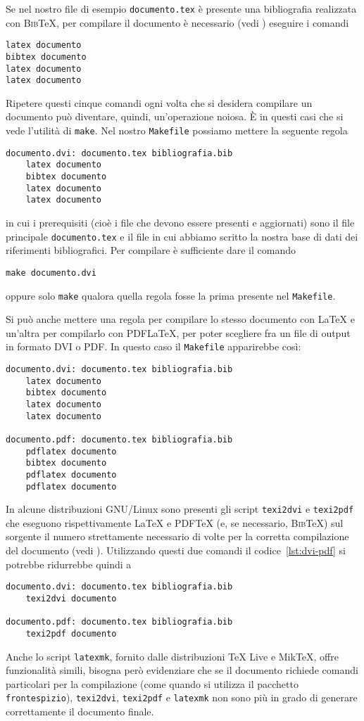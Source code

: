 Se nel nostro file di esempio \verb|documento.tex| è presente una bibliografia
realizzata con \textsc{Bib}\TeX, per compilare il documento è necessario (vedi
\textcite[120]{pantieri:latex}) eseguire i comandi
\begin{verbatim}
latex documento
bibtex documento
latex documento
latex documento
\end{verbatim}

Ripetere questi cinque comandi ogni volta che si desidera compilare un documento
può diventare, quindi, un'operazione noiosa.  È in questi casi che si vede
l'utilità di \verb|make|.  Nel nostro \verb|Makefile| possiamo mettere la
seguente regola
\begin{lstlisting}
documento.dvi: documento.tex bibliografia.bib
	latex documento
	bibtex documento
	latex documento
	latex documento
\end{lstlisting}
in cui i prerequisiti (cioè i file che devono essere presenti e aggiornati) sono
il file principale \verb|documento.tex| e il file in cui abbiamo scritto la
nostra base di dati dei riferimenti bibliografici.  Per compilare è sufficiente
dare il comando
\begin{verbatim}
make documento.dvi
\end{verbatim}
oppure solo \verb|make| qualora quella regola fosse la prima presente nel
\verb|Makefile|.

Si può anche mettere una regola per compilare lo stesso documento con \LaTeX{}
e un'altra per compilarlo con \textsc{PDF}\LaTeX, per poter scegliere fra un
file di output in formato \textsc{DVI} o \textsc{PDF}.  In questo caso il
\verb|Makefile| apparirebbe così:
\begin{lstlisting}[caption={La prima regola permette di compilare un documento con
\LaTeX, la seconda con \textsc{PDF}\LaTeX},label=lst:dvi-pdf]
documento.dvi: documento.tex bibliografia.bib
	latex documento
	bibtex documento
	latex documento
	latex documento

documento.pdf: documento.tex bibliografia.bib
	pdflatex documento
	bibtex documento
	pdflatex documento
	pdflatex documento
\end{lstlisting}

In alcune distribuzioni GNU/Linux sono presenti gli script \verb|texi2dvi| e
\verb|texi2pdf| che eseguono rispettivamente \LaTeX{}
e \textsc{PDF}\TeX{}
(e, se necessario, \textsc{Bib}\TeX) sul sorgente il numero strettamente
necessario di volte per la corretta compilazione del documento (vedi
\textcite[63]{caucci:tabelle}).  Utilizzando questi due comandi il
codice~\ref{lst:dvi-pdf} si potrebbe ridurrebbe quindi a
\begin{lstlisting}
documento.dvi: documento.tex bibliografia.bib
	texi2dvi documento

documento.pdf: documento.tex bibliografia.bib
	texi2pdf documento
\end{lstlisting}
Anche lo script \verb|latexmk|, fornito dalle distribuzioni TeX Live e MikTeX,
offre funzionalità simili, bisogna però evidenziare che se il documento richiede
comandi particolari per la compilazione (come quando si utilizza il pacchetto
\verb|frontespizio|), \verb|texi2dvi|, \verb|texi2pdf| e \verb|latexmk| non sono
più in grado di generare correttamente il documento finale.

